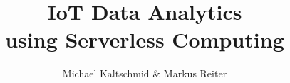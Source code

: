 \documentclass[a4paper,12pt,parskip]{scrartcl}
\title{IoT Data Analytics \\ using Serverless Computing}
\author{Michael Kaltschmid \& Markus Reiter}
\date{}
\begin{document}
  \maketitle

  \newpage
  

  \newpage
  

  \newpage
  \tableofcontents

  \newpage
  \listoffigures

  \newpage
  \listoftables
  \listofcodes

  \newpage
  

  \newpage
  
  \newpage
  
  \newpage
  
  \newpage
  
  \newpage
  
  \newpage
  

  \newpage
  \printbibliography

  \newpage
  
\end{document}

